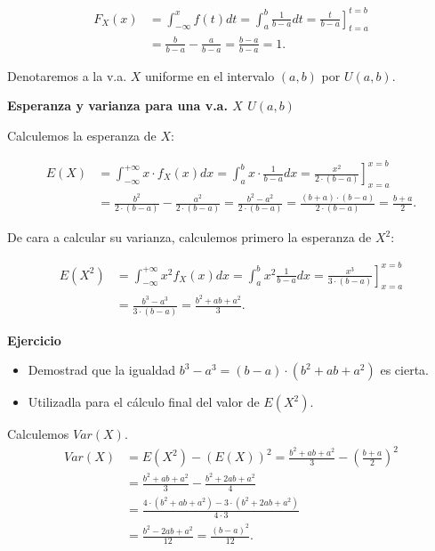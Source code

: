 \documentclass[]{book}
\begin{document}
\[
\begin{array}{rl}
F_X(x)&=\displaystyle\int_{-\infty}^{x} f(t) dt=\int_{a}^{b} \frac{1}{b-a} dt=
  \left.  \frac{t}{b-a} \right]_{t=a}^{t=b}
\\&=\displaystyle \frac{b}{b-a}-\frac{a}{b-a}=\frac{b-a}{b-a}=1.
\end{array}
\]

Denotaremos a la v.a. \(X\) uniforme en el intervalo \((a,b)\) por \(U(a,b)\).

\textbf{Esperanza y varianza para una v.a. \(X\) \(U(a,b)\)}

Calculemos la esperanza de \(X\):

\[
\begin{array}{rl}
E(X)&=\displaystyle\int_{-\infty}^{+\infty} x\cdot f_X(x) dx =\int_{a}^{b} x \cdot \frac{1}{b-a} dx =
\left.\frac{x^2}{2\cdot (b-a)}\right]_{x=a}^{x=b}\\
&=\displaystyle \frac{b^2}{2\cdot (b-a)}-\frac{a^2}{2\cdot (b-a)}=
\frac{b^2-a^2}{2\cdot (b-a)}=\frac{(b+a)\cdot (b-a)}{2\cdot (b-a)}=
\frac{b+a}{2}.
\end{array}
\]

De cara a calcular su varianza, calculemos primero la esperanza de \(X^2\):

\[
\begin{array}{rl}
E(X^2)&=\displaystyle\int_{-\infty}^{+\infty} x^2 f_X(x) dx=\int_{a}^{b} x^2 \frac1{b-a}
dx =\left.\frac{x^3}{3\cdot (b-a)}\right]_{x=a}^{x=b} \\
&=\displaystyle\frac{b^3-a^3}{3\cdot (b-a)}=\frac{b^2+ab+a^2}{3}.
\end{array}
\]

\textbf{Ejercicio}

\begin{itemize}
\item
  Demostrad que la igualdad \(b^3-a^3=(b-a)\cdot (b^2+ab+a^2)\) es cierta.
\item
  Utilizadla para el cálculo final del valor de \(E(X^2)\).
\end{itemize}

Calculemos \(Var(X)\).
\[
\begin{array}{rl}
Var(X)&=\displaystyle E(X^2)-(E(X))^2=\frac{b^2+ab+a^2}3-\left(\frac{b+a}2\right)^2\\&=\displaystyle
\frac{b^2+ab+a^2}{3}-\frac{b^2+2ab+a^2}{4}\\
&=\displaystyle
\frac{4\cdot (b^2+ab+a^2)-3\cdot (b^2+2ab+a^2)}{4\cdot 3}
\\
&=\displaystyle
\frac{b^2-2ab+a^2}{12}=
\frac{(b-a)^2}{12}.
\end{array}
\]
\end{document}
